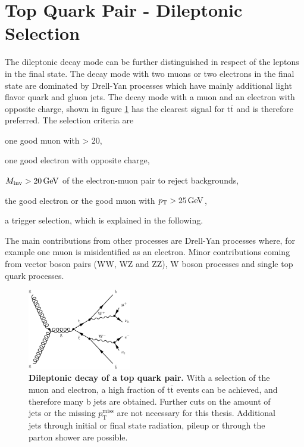 \section{Top Quark Pair - Dileptonic  Selection} \label{sec:ch_6_dilep}
The dileptonic decay mode can be further distinguished in respect of the leptons in the final state. The decay mode with two muons or two electrons in the final state are dominated by Drell-Yan processes which have mainly additional light flavor quark and gluon jets. The decay mode with a muon and an electron with opposite charge, shown in figure \ref{fig:ch_6_semilep_dilep} has the clearest signal for t$\bar{\textrm{t}}$ and is therefore preferred. The selection criteria are
\begin{description}
\setlength{\itemsep}{-20pt}
\item[•] one good muon with \pt > 20,\\
\item[•] one good electron with opposite charge,\\
\item[•] $M_\textrm{inv} > 20\,\mathrm{GeV}$ of the electron-muon pair to reject backgrounds,\\
\item[•] the good electron or the good muon with $p_\mathrm{T} > 25\,\mathrm{GeV}$,\\
\item[•] a trigger selection, which is explained in the following.
\end{description}
The main contributions from other processes are Drell-Yan processes where, for example one muon is misidentified as an electron. Minor contributions coming from vector boson pairs (WW, WZ and ZZ), W boson processes and single top quark processes. 

\begin{figure}
\centering
\includegraphics[width=0.4\textwidth]{assets/Feynman/dilep_emu_tt.pdf}
\caption[Dileptonic Decay of a Top Quark Pair]{\textbf{Dileptonic decay of a top quark pair.} With a selection of the muon and electron, a high fraction of t$\bar{\textrm{t}}$ events can be achieved, and therefore many b jets are obtained. Further cuts on the amount of jets or the missing $p_\textrm{T}^\textrm{miss}$ are not necessary for this thesis. Additional jets through initial or final state radiation, pileup or through the parton shower are possible.}
\label{fig:ch_6_semilep_dilep}
\end{figure}


